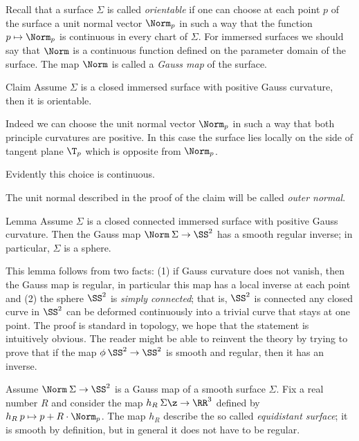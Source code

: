 Recall that a surface $\Sigma$ is called \emph{orientable} if one can choose at each point $p$ of the surface
a unit normal vector $\Norm_p$  in such a way that the function $p\mapsto \Norm_p$ is continuous in every chart of $\Sigma$.
For immersed surfaces we should say that $\Norm$ is a continuous function defined on the parameter domain of the surface.
The map $\Norm$ is called a \emph{Gauss map} of the surface.

\begin{thm}{Claim}
Assume $\Sigma$ is a closed immersed surface with positive Gauss curvature, then it is orientable.
\end{thm}


 Indeed we can choose the unit normal vector $\Norm_p$ in such a way that both principle curvatures are positive. 
In this case the surface lies locally on the side of tangent plane $\T_p$ which is opposite from $\Norm_p$.

Evidently this choice is  continuous.
\qeds

The unit normal described in the proof of the claim will be called \emph{outer normal}.

\begin{thm}{Lemma}\label{lem:gauss-inverse}
Assume $\Sigma$ is a closed connected immersed surface with positive Gauss curvature.
Then the Gauss map $\Norm\:\Sigma \to \SS^2$ has a smooth regular inverse;
in particular, $\Sigma$ is a sphere.
\end{thm}

This lemma follows from two facts:
(1) if Gauss curvature does not vanish, then the  Gauss map is regular, in particular this map has a local inverse at each point
and
(2) the sphere $\SS^2$ is \emph{simply connected};
that is, $\SS^2$ is connected any closed curve in $\SS^2$ can be deformed continuously into a trivial curve that stays at one point.
The proof is standard in topology, we hope that the statement is intuitively obvious.
The reader might be able to reinvent the theory by trying to prove that if the map $\phi\:\SS^2\to\SS^2$ is smooth and regular, then it has an inverse.

Assume $\Norm\:\Sigma\to \SS^2$ is a Gauss map of a smooth surface $\Sigma$.
Fix a real number $R$ and consider the map $h_R\:\Sigma\z\to\RR^3$ defined by $h_R\:p\mapsto p+R\cdot\Norm_p$.
The map $h_R$ describe the so called \emph{equidistant surface};
it is smooth by definition, but in general it does not have to be regular.

